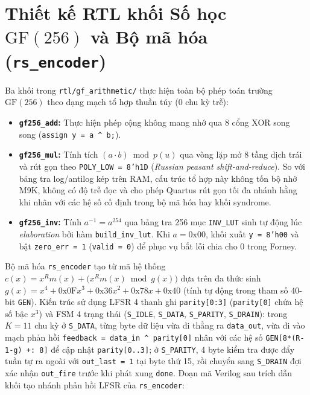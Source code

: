 \section{Thiết kế RTL khối Số học $\mathrm{GF}(256)$ và Bộ mã hóa (\texttt{rs\_encoder})}
\label{sec:gf-encoder}

Ba khối trong \texttt{rtl/gf\_arithmetic/} thực hiện toàn bộ phép toán trường $\mathrm{GF}(256)$ theo dạng mạch tổ hợp thuần túy (0 chu kỳ trễ):
\begin{itemize}
    \item \textbf{\texttt{gf256\_add}:} Thực hiện phép cộng không mang nhớ qua 8 cổng XOR song song (\texttt{assign y = a \textasciicircum{} b;}).
    \item \textbf{\texttt{gf256\_mul}:} Tính tích $(a \cdot b) \bmod p(u)$ qua vòng lặp mở 8 tầng dịch trái và rút gọn theo \texttt{POLY\_LOW = 8'h1D} (\textit{Russian peasant shift-and-reduce}). So với bảng tra log/antilog kép trên RAM, cấu trúc tổ hợp này không tốn bộ nhớ M9K, không có độ trễ đọc và cho phép Quartus rút gọn tối đa nhánh hằng khi nhân với các hệ số cố định trong bộ mã hóa hay khối syndrome.
    \item \textbf{\texttt{gf256\_inv}:} Tính $a^{-1} = a^{254}$ qua bảng tra 256 mục \texttt{INV\_LUT} sinh tự động lúc \textit{elaboration} bởi hàm \texttt{build\_inv\_lut}. Khi $a = \text{0x00}$, khối xuất \texttt{y = 8'h00} và bật \texttt{zero\_err = 1} (\texttt{valid = 0}) để phục vụ bắt lỗi chia cho 0 trong Forney.
\end{itemize}

Bộ mã hóa \texttt{rs\_encoder} tạo từ mã hệ thống $c(x) = x^R m(x) + \big(x^R m(x) \bmod g(x)\big)$ dựa trên đa thức sinh $g(x) = x^4 + \text{0x0F}x^3 + \text{0x36}x^2 + \text{0x78}x + \text{0x40}$ (tính tự động trong tham số 40-bit \texttt{GEN}). Kiến trúc sử dụng LFSR 4 thanh ghi \texttt{parity[0:3]} (\texttt{parity[0]} chứa hệ số bậc $x^3$) và FSM 4 trạng thái (\texttt{S\_IDLE}, \texttt{S\_DATA}, \texttt{S\_PARITY}, \texttt{S\_DRAIN}): trong $K=11$ chu kỳ ở \texttt{S\_DATA}, từng byte dữ liệu vừa đi thẳng ra \texttt{data\_out}, vừa đi vào mạch phản hồi \texttt{feedback = data\_in \textasciicircum{} parity[0]} nhân với các hệ số \texttt{GEN[8*(R-1-g) +: 8]} để cập nhật \texttt{parity[0..3]}; ở \texttt{S\_PARITY}, 4 byte kiểm tra được đẩy tuần tự ra ngoài với \texttt{out\_last = 1} tại byte thứ 15, rồi chuyển sang \texttt{S\_DRAIN} đợi xác nhận \texttt{out\_fire} trước khi phát xung \texttt{done}. Đoạn mã Verilog sau trích dẫn khối tạo nhánh phản hồi LFSR của \texttt{rs\_encoder}:

